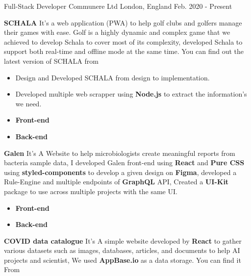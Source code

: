 \begin{cventries}
  \cventry
    {Full-Stack Developer} %
    {Communere Ltd } %
    {London, England} %
    {Feb. 2020 - Present} %
    {
        \textcolor{primary}{\textbf{SCHALA}}\break
        {It’s a web application (PWA) to help golf clubs and golfers manage their games with ease. Golf is a highly dynamic and complex game that we achieved to develop Schala to cover most of its complexity, developed Schala to support both real-time and offline mode at the same time. You can find out the latest version of SCHALA from }
        \begin{itemize}
            \item Design and Developed SCHALA from design to implementation.
            \item Developed multiple web scrapper using \textbf{Node.js} to extract the information's we need.
            \item \textbf{Front-end} 
            \item \textbf{Back-end}  
        \end{itemize}
        \textcolor{primary}{\textbf{Galen}}\break
        {It's A Website to help microbiologists create meaningful reports from bacteria sample data, I developed Galen front-end using \textbf{React} and \textbf{Pure CSS} using \textbf{styled-components} to develop a given design on \textbf{Figma}, developed a Rule-Engine and multiple endpoints of \textbf{GraphQL} API, Created a \textbf{UI-Kit} package to use across multiple projects with the same UI.}
        \begin{itemize}
        \item \textbf{Front-end} 
            \item \textbf{Back-end}  
        \end{itemize}
        \textcolor{primary}{\textbf{COVID data catalogue}}\break
        {It's A simple website developed by \textbf{React} to gather various datasets such as images, databases, articles, and documents to help AI projects and scientist, We used \textbf{AppBase.io} as a data storage. You can find it From }\break
}
\end{cventries}
